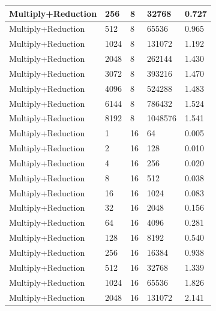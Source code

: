 \documentclass{article}
\begin{document}
\begin{longtable}{|l|l|l|l|l|}
Multiply+Reduction & 256  & 8           & 32768             & 0.727             \\ \hline
Multiply+Reduction & 512  & 8           & 65536             & 0.965             \\ \hline
Multiply+Reduction & 1024 & 8           & 131072            & 1.192             \\ \hline
Multiply+Reduction & 2048 & 8           & 262144            & 1.430             \\ \hline
Multiply+Reduction & 3072 & 8           & 393216            & 1.470             \\ \hline
Multiply+Reduction & 4096 & 8           & 524288            & 1.483             \\ \hline
Multiply+Reduction & 6144 & 8           & 786432            & 1.524             \\ \hline
Multiply+Reduction & 8192 & 8           & 1048576           & 1.541             \\ \hline
Multiply+Reduction & 1    & 16          & 64                & 0.005             \\ \hline
Multiply+Reduction & 2    & 16          & 128               & 0.010             \\ \hline
Multiply+Reduction & 4    & 16          & 256               & 0.020             \\ \hline
Multiply+Reduction & 8    & 16          & 512               & 0.038             \\ \hline
Multiply+Reduction & 16   & 16          & 1024              & 0.083             \\ \hline
Multiply+Reduction & 32   & 16          & 2048              & 0.156             \\ \hline
Multiply+Reduction & 64   & 16          & 4096              & 0.281             \\ \hline
Multiply+Reduction & 128  & 16          & 8192              & 0.540             \\ \hline
Multiply+Reduction & 256  & 16          & 16384             & 0.938             \\ \hline
Multiply+Reduction & 512  & 16          & 32768             & 1.339             \\ \hline
Multiply+Reduction & 1024 & 16          & 65536             & 1.826             \\ \hline
Multiply+Reduction & 2048 & 16          & 131072            & 2.141             \\ \hline

\end{longtable}
\end{document}
